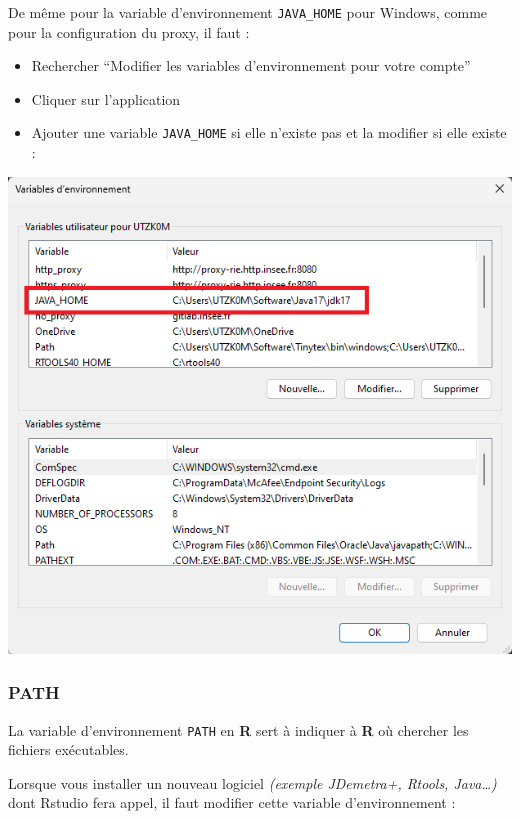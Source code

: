 \documentclass[
]{article}
\providecommand{\tightlist}{%
  \setlength{\itemsep}{0pt}\setlength{\parskip}{0pt}}
\begin{document}
De même pour la variable d'environnement \texttt{JAVA\_HOME} pour
Windows, comme pour la configuration du proxy, il faut :

\begin{itemize}
\tightlist
\item
  Rechercher ``Modifier les variables d'environnement pour votre
  compte''
\item
  Cliquer sur l'application
\item
  Ajouter une variable \texttt{JAVA\_HOME} si elle n'existe pas et la
  modifier si elle existe :
\end{itemize}

\includegraphics{../img/modify_java_home.png}

\hypertarget{path}{%
\subsubsection{PATH}\label{path}}

La variable d'environnement \texttt{PATH} en \textbf{R} sert à indiquer
à \textbf{R} où chercher les fichiers exécutables.

Lorsque vous installer un nouveau logiciel \emph{(exemple JDemetra+,
Rtools, Java\ldots)} dont Rstudio fera appel, il faut modifier cette
variable d'environnement :
\end{document}
